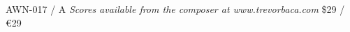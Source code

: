 \documentclass{article}
\begin{document}
\null \vfill

AWN-017 / A \hfill
\textit{Scores available from the composer at www.trevorbaca.com}
\hfill \$29 / \euro 29
\end{document}
